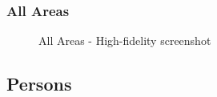 \documentclass[11pt, letterpaper]{article}
\begin{document}
\subsubsection*{All Areas}
\begin{figure}[H]
    \centering
    \setlength{\fboxsep}{0pt}
    \caption{All Areas - High-fidelity screenshot}
    \label{fig:PageScreenshot_All_areas}
\end{figure}

\subsection{Persons}
\end{document}
